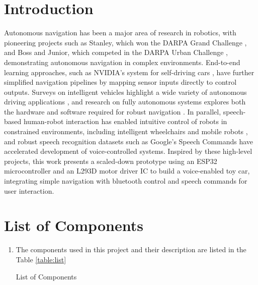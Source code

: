 \documentclass[conference]{IEEEtran}
\begin{document}
\section{Introduction}
Autonomous navigation has been a major area of research in robotics, with pioneering projects such as Stanley, which won the DARPA Grand Challenge \cite{thrun2006stanley}, and Boss and Junior, which competed in the DARPA Urban Challenge \cite{urmson2008boss, montemerlo2008junior}, demonstrating autonomous navigation in complex environments. End-to-end learning approaches, such as NVIDIA's system for self-driving cars \cite{bojarski2016end}, have further simplified navigation pipelines by mapping sensor inputs directly to control outputs. Surveys on intelligent vehicles highlight a wide variety of autonomous driving applications \cite{bishop2000survey}, and research on fully autonomous systems explores both the hardware and software required for robust navigation \cite{levinson2011towards}. In parallel, speech-based human-robot interaction has enabled intuitive control of robots in constrained environments, including intelligent wheelchairs and mobile robots \cite{li2017speech, prasad2013voice, vasudevan2010speech}, and robust speech recognition datasets such as Google’s Speech Commands \cite{warden2018speech} have accelerated development of voice-controlled systems. Inspired by these high-level projects, this work presents a scaled-down prototype using an ESP32 microcontroller and an L293D motor driver IC to build a voice-enabled toy car, integrating simple navigation with bluetooth control and speech commands for user interaction.

\section{List of Components}
\begin{enumerate}[label=\thesection.\arabic*,ref=\thesection.\theenumi]
\item The components used in this project and their description are listed in the Table \ref{table:list}
\begin{table}[h!]
  \centering
  
  \caption{List of Components}
  \label{table:list}
\end{table}

\end{enumerate}
\end{document}
